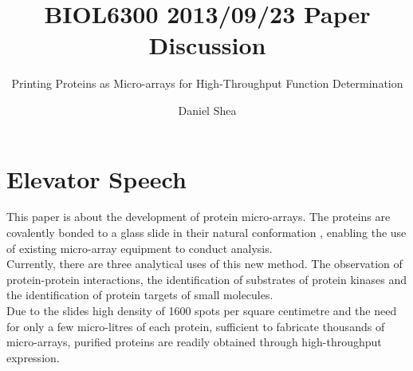 \documentclass[10pt]{paper}
\title{BIOL6300 2013/09/23 Paper Discussion}
\subtitle{Printing Proteins as Micro-arrays for High-Throughput Function Determination}
\author{Daniel Shea}
\begin{document}
\maketitle
\section{Elevator Speech}
This paper is about the development of protein micro-arrays.  The proteins are covalently bonded to a glass slide in their natural conformation , enabling the use of existing micro-array equipment to conduct analysis.\\
Currently, there are three analytical uses of this new method.  The observation of protein-protein interactions, the identification of substrates of protein kinases and the identification of protein targets of small molecules.\\
Due to the slides high density of 1600 spots per square centimetre and the need for only a few micro-litres of each protein, sufficient to fabricate thousands of micro-arrays, purified proteins are readily obtained through high-throughput expression.
\end{document}
